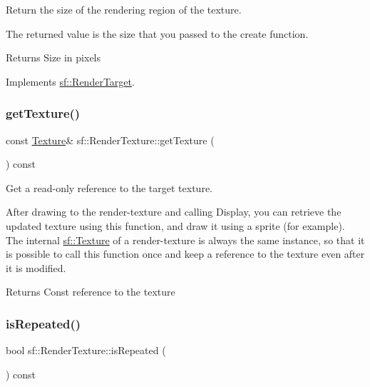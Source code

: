Return the size of the rendering region of the texture. 

The returned value is the size that you passed to the create function.

\begin{DoxyReturn}{Returns}
Size in pixels 
\end{DoxyReturn}


Implements \hyperlink{classsf_1_1_render_target_a2e5ade2457d9fb4c4907ae5b3d9e94a5}{sf\+::\+Render\+Target}.

\mbox{\label{classsf_1_1_render_texture_a07ecea85f05932fa02a8279416721bc9}} 
\subsubsection{\texorpdfstring{get\+Texture()}{getTexture()}}
{\footnotesize\ttfamily const \hyperlink{classsf_1_1_texture}{Texture}\& sf\+::\+Render\+Texture\+::get\+Texture (\begin{DoxyParamCaption}{ }\end{DoxyParamCaption}) const}



Get a read-\/only reference to the target texture. 

After drawing to the render-\/texture and calling Display, you can retrieve the updated texture using this function, and draw it using a sprite (for example). The internal \hyperlink{classsf_1_1_texture}{sf\+::\+Texture} of a render-\/texture is always the same instance, so that it is possible to call this function once and keep a reference to the texture even after it is modified.

\begin{DoxyReturn}{Returns}
Const reference to the texture 
\end{DoxyReturn}
\mbox{\label{classsf_1_1_render_texture_a81c5a453a21c7e78299b062b97dc8c87}} 
\subsubsection{\texorpdfstring{is\+Repeated()}{isRepeated()}}
{\footnotesize\ttfamily bool sf\+::\+Render\+Texture\+::is\+Repeated (\begin{DoxyParamCaption}{ }\end{DoxyParamCaption}) const}



